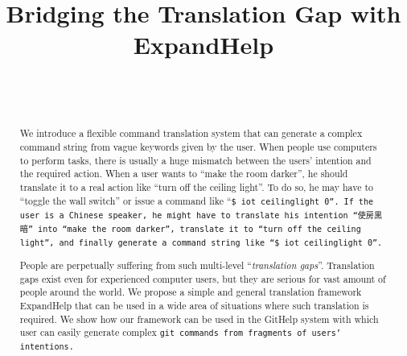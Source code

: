 \documentclass{sigchi}
\def\plaintitle{Bridging the Translation Gap with ExpandHelp}
\def\GH{\textsf{GitHelp}}
\def\EH{\textsf{ExpandHelp}}
\begin{document}
\title{\plaintitle}

\author{%
  \\
  \\
}

\maketitle

\begin{abstract}
  We introduce a flexible command translation system that can generate
  a complex command string from vague keywords
  given by the user.
  When people use computers to perform tasks,
  there is usually a huge mismatch between the users' intention
  and the required action.
  When a user wants to ``make the room darker'',
  he should translate it to a real action like ``turn off the ceiling light''.
  To do so,
  he may have to ``toggle the wall switch''
  or issue a command like ``\tt{\$ iot ceilinglight 0}''.
  If the user is a Chinese speaker, he might have to translate his intention
  ``使房黒暗'' into ``make the room darker'',
  translate it to ``turn off the ceiling light'', 
  and finally generate a command string like ``\tt{\$ iot ceilinglight 0}''.

  People are perpetually suffering from such multi-level ``\textit{translation gaps}''.
  Translation gaps exist even for experienced computer users, but
  they are serious for vast amount of people around the world.
  We propose a simple and general translation framework
  {\EH} that can be used in a wide area of situations
  where such translation is required.
  We show how our framework can be used
  in the {\GH} system
  with which user can easily generate complex \tt{git} commands
  from fragments of users' intentions.

\end{abstract}

 
\end{document}
